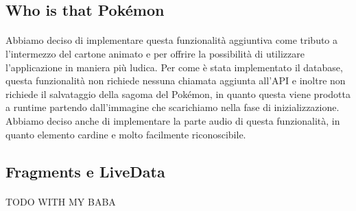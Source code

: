 \documentclass[a4paper,11pt]{article}
\begin{document}
				\subsection{Who is that Pokémon}
					\paragraph{}
						Abbiamo deciso di implementare questa funzionalità aggiuntiva come tributo a l’intermezzo del cartone animato e per offrire la possibilità di utilizzare l’applicazione in maniera più ludica. Per come è stata implementato il database, questa funzionalità non richiede nessuna chiamata aggiunta all’API e inoltre non richiede il salvataggio della sagoma del Pokémon, in quanto questa viene prodotta a runtime partendo dall’immagine che scarichiamo nella fase di inizializzazione.\\
						Abbiamo deciso anche di implementare la parte audio di questa funzionalità, in quanto elemento cardine e molto facilmente riconoscibile.\\
				\subsection{Fragments e LiveData}
					\paragraph{}
						TODO WITH MY BABA
				\newpage

				
  						
\end{document}
